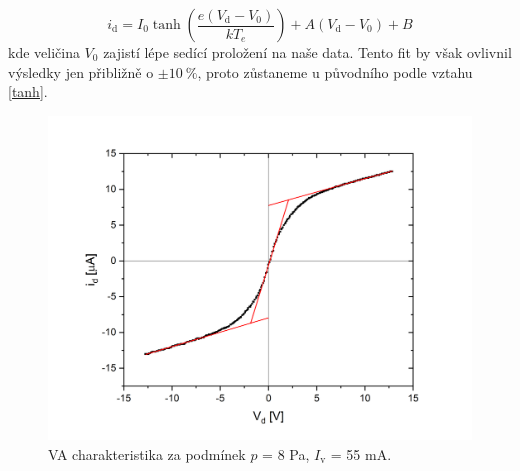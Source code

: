 \documentclass[a4paper,12pt]{article}
\begin{document}
\begin{equation}
	i_\text{{d}} = I_0 \tanh\left( \frac{e (V_\text{d} - V_0) }{k T_e} \right) + A (V_\text{d} - V_0) + B 
\end{equation}
kde veličina $V_0$ zajistí lépe sedící proložení na naše data.
Tento fit by však ovlivnil výsledky jen přibližně o $\pm 10~\%$, proto zůstaneme u původního podle
vztahu \eqref{tanh}.

\newpage
\begin{figure}[h!]
	\centering
	\includegraphics[width=130mm]{dvojna1.png}
	\caption{VA charakteristika za podmínek $p$ = 8 \si{\pascal}, $I_\text{{v}}$ = 55 \si{\milli\ampere}.}
	\label{dvojna1}
\end{figure}
\end{document}
